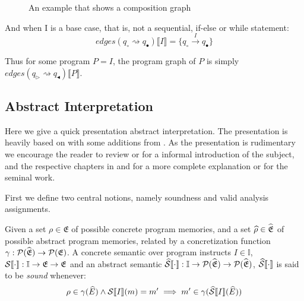 \begin{figure}
    \center
    
    \caption{An example that shows a composition graph}
    \label{fig:tikz-composition-graph}
\end{figure}

And when I is a base case, that is, not a sequential, if-else or while statement:
\begin{equation}
    edges(q_\circ \rightsquigarrow q_\bullet) \llbracket I \rrbracket = \{q_\circ \xrightarrow{I} q_\bullet\}
\end{equation}

Thus for some program $P = I$, the program graph of $P$ is simply $edges(q_\triangleright \rightsquigarrow q_\blacktriangleleft)\llbracket P \rrbracket$.

\subsection{Abstract Interpretation}\label{subsec:abstract-interpretation2}

Here we give a quick presentation abstract interpretation.
The presentation is heavily based on \cite{nielson_formal_2019} with some additions from \cite{moller_statitc_nodate}.
As the presentation is rudimentary we encourage the reader to review \cite{noauthor_abstract_nodate} or \cite{cousot_abstract_1996} for a informal introduction of the subject, and the respective chapters in \cite{nielson_formal_2019} and \cite{moller_statitc_nodate} for a more complete explanation or \cite{cousot_abstract_1977} for the seminal work.

First we define two central notions, namely soundness and valid analysis assignments.

\begin{definition}
    Given a set $\rho \in \mathfrak{E}$ of possible concrete program memories, and a set $\widehat{\rho} \in \widehat{\mathfrak{E}}$ of possible abstract program memories, related by a concretization function $\gamma : \mathcal{P}(\widehat{\mathfrak{E}}) \rightarrow \mathcal{P}(\mathfrak{E})$.
    A concrete semantic over program instructs $I \in \mathbb{I}$, $\mathcal{S} \llbracket \cdot \rrbracket : \mathbb{I} \rightarrow \mathfrak{E} \rightarrow \mathfrak{E}$ and an abstract semantic $\widehat{\mathcal{S}} \llbracket \cdot \rrbracket : \mathbb{I} \rightarrow \mathcal{P}(\widehat{\mathfrak{E}}) \rightarrow \mathcal{P}(\widehat{\mathfrak{E}})$, $\widehat{\mathcal{S}} \llbracket \cdot \rrbracket$ is said to be \emph{sound} whenever:
    \begin{equation}
        \rho \in \gamma(\widehat{E}) \land \mathcal{S} \llbracket I \rrbracket(m) = m' \implies m' \in \gamma(\widehat{\mathcal{S}} \llbracket I \rrbracket(\widehat{E}))
    \end{equation}
\end{definition}

